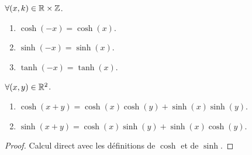 \begin{proposition}
	$\forall (x,k) \in \mathbb{R} \times \mathbb{Z}$.
	\begin{enumerate}
		\item $\cosh(-x) = \cosh(x)$.
		\item $\sinh(-x) = \sinh(x)$.
		\item $\tanh(-x) = \tanh(x)$.
	\end{enumerate}
\end{proposition}

\begin{proposition}
	$\forall (x, y) \in \mathbb{R}^2$.
    \begin{enumerate}
        \item $\cosh(x + y) = \cosh(x) \cosh(y) + \sinh(x) \sinh(y)$.
        \item $\sinh(x + y) = \cosh(x) \sinh(y) + \sinh(x) \cosh(y)$.
    \end{enumerate}
\end{proposition}

\begin{proof}
    Calcul direct avec les définitions de $\cosh$ et de $\sinh$.
\end{proof}
